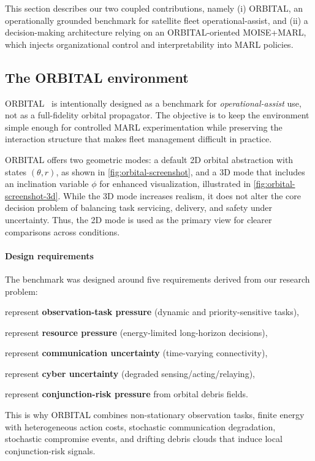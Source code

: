 \documentclass[sigconf]{aamas}
\begin{document}
This section describes our two coupled contributions, namely (i) ORBITAL, an operationally grounded benchmark for satellite fleet operational-assist, and (ii) a decision-making architecture relying on an ORBITAL-oriented MOISE+MARL, which injects organizational control and interpretability into MARL policies.

\subsection{The ORBITAL environment}
ORBITAL~\hyperref[fn:github]{\footnotemark[1]} is intentionally designed as a benchmark for \emph{operational-assist} use, not as a full-fidelity orbital propagator. The objective is to keep the environment simple enough for controlled MARL experimentation while preserving the interaction structure that makes fleet management difficult in practice.

ORBITAL offers two geometric modes: a default 2D orbital abstraction with states $(\theta, r)$, as shown in \autoref{fig:orbital-screenshot}, and a 3D mode that includes an inclination variable $\phi$ for enhanced visualization, illustrated in \autoref{fig:orbital-screenshot-3d}. While the 3D mode increases realism, it does not alter the core decision problem of balancing task servicing, delivery, and safety under uncertainty. Thus, the 2D mode is used as the primary view for clearer comparisons across conditions.

\paragraph{Design requirements}
The benchmark was designed around five requirements derived from our research problem:
\begin{enumerate*}[label={\roman*) },itemjoin={; \quad}]
    \item represent \textbf{observation-task pressure} (dynamic and priority-sensitive tasks),
    \item represent \textbf{resource pressure} (energy-limited long-horizon decisions),
    \item represent \textbf{communication uncertainty} (time-varying connectivity),
    \item represent \textbf{cyber uncertainty} (degraded sensing/acting/relaying),
    \item represent \textbf{conjunction-risk pressure} from orbital debris fields.
\end{enumerate*}
This is why ORBITAL combines non-stationary observation tasks, finite energy with heterogeneous action costs, stochastic communication degradation, stochastic compromise events, and drifting debris clouds that induce local conjunction-risk signals.
\end{document}
